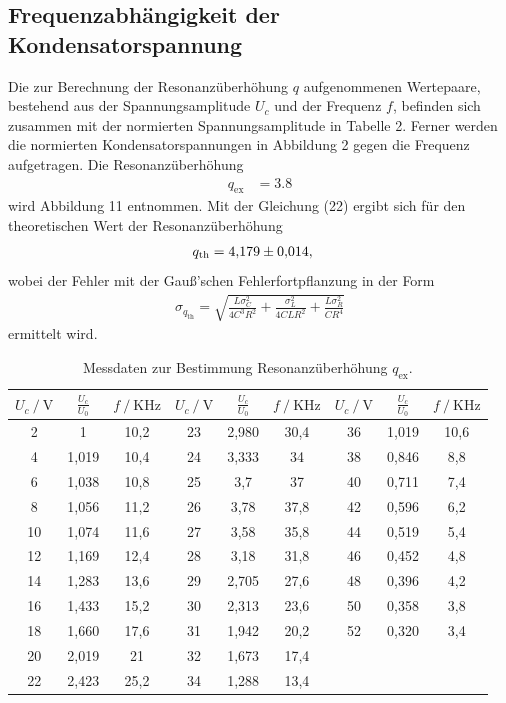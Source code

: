 \subsection{Frequenzabhängigkeit der Kondensatorspannung}
Die zur Berechnung der Resonanzüberhöhung $q$ aufgenommenen Wertepaare, bestehend aus der Spannungsamplitude $U_c$ und der Frequenz $f$, befinden sich zusammen mit der
normierten Spannungsamplitude in Tabelle 2. Ferner werden die normierten Kondensatorspannungen in Abbildung 2 gegen die Frequenz aufgetragen.
Die Resonanzüberhöhung 
\begin{align*}
q_\text{ex} &= \num{3.8}
\end{align*}
wird Abbildung 11 entnommen. Mit der Gleichung (22) ergibt sich für den theoretischen Wert der Resonanzüberhöhung 
\begin{align*}
q_\text{th} &= \num{4.179 +-0.014},
\end{align*}
wobei der Fehler mit der Gauß'schen Fehlerfortpflanzung in der Form
\begin{align*}
\sigma_{q_\text{th}} = \sqrt{\frac{L \sigma_{C}^{2}}{4C^{3} R^{2}} + \frac{\sigma_{L}^{2}}{4C L R^{2}} + \frac{L \sigma_{R}^{2}}{C R^{4}}}
\end{align*}
ermittelt wird.

\begin{table}
\centering
\caption{Messdaten zur Bestimmung Resonanzüberhöhung $q_\text{ex}$.}
\label{tab:some_data}
\begin{tabular}{c c c c c c c c c}
\toprule
$\mathit{U_c \: / \: \mathrm{V}}$ & $\frac{U_c}{U_0}$ & $\mathit{f \: / \: \mathrm{KHz}}$ & $\mathit{U_c \: / \: \mathrm{V}}$ & $\frac{U_c}{U_0}$ & $\mathit{f \: / \: \mathrm{KHz}}$ & $\mathit{U_c \: / \: \mathrm{V}}$ & $\frac{U_c}{U_0}$ & $\mathit{f \: / \: \mathrm{KHz}}$ \\
\midrule
2  & 1     & 10,2 & 23 & 2,980  & 30,4 & 36 & 1,019  & 10,6 \\
4  & 1,019  & 10,4 & 24 & 3,333  & 34 & 38 & 0,846  &  8,8 \\
6  & 1,038  & 10,8 & 25 & 3,7    & 37 & 40 & 0,711  &  7,4 \\
8  & 1,056  & 11,2 & 26 & 3,78   & 37,8 & 42 & 0,596  &  6,2 \\
10 & 1,074  & 11,6 & 27 & 3,58   & 35,8 & 44 & 0,519  &  5,4 \\
12 & 1,169  & 12,4 & 28 & 3,18   & 31,8 & 46 & 0,452  &  4,8 \\
14 & 1,283  & 13,6 & 29 & 2,705  & 27,6 & 48 & 0,396  &  4,2 \\
16 & 1,433  & 15,2 & 30 & 2,313  & 23,6 & 50 & 0,358  &  3,8 \\
18 & 1,660  & 17,6 & 31 & 1,942  & 20,2 & 52 & 0,320  &  3,4 \\
20 & 2,019  & 21 & 32 & 1,673  & 17,4 & & & \\
22 & 2,423  & 25,2 & 34 & 1,288  & 13,4 & & & \\
\bottomrule
\end{tabular}
\end{table}

